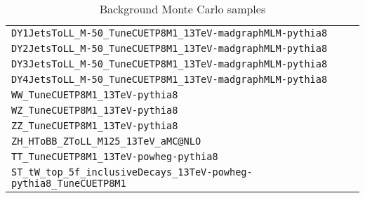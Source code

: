 \begin{table}[htbp]%
  \begin{center}
    \caption{Background Monte Carlo samples\label{tab:bg_mcsamples}}
    \begin{tabular}{|c|}%
      \hline
      \multicolumn{5}{|l|}{\texttt{DY1JetsToLL\_M-50\_TuneCUETP8M1\_13TeV-madgraphMLM-pythia8}} \\
      \multicolumn{5}{|l|}{\texttt{DY2JetsToLL\_M-50\_TuneCUETP8M1\_13TeV-madgraphMLM-pythia8}} \\
      \multicolumn{5}{|l|}{\texttt{DY3JetsToLL\_M-50\_TuneCUETP8M1\_13TeV-madgraphMLM-pythia8}} \\
      \multicolumn{5}{|l|}{\texttt{DY4JetsToLL\_M-50\_TuneCUETP8M1\_13TeV-madgraphMLM-pythia8}} \\
      \multicolumn{5}{|l|}{\texttt{WW\_TuneCUETP8M1\_13TeV-pythia8}} \\
      \multicolumn{5}{|l|}{\texttt{WZ\_TuneCUETP8M1\_13TeV-pythia8}} \\
      \multicolumn{5}{|l|}{\texttt{ZZ\_TuneCUETP8M1\_13TeV-pythia8}} \\
       \multicolumn{5}{|l|}{\texttt{ZH\_HToBB\_ZToLL\_M125\_13TeV\_aMC@NLO}} \\
      \multicolumn{5}{|l|}{\texttt{TT\_TuneCUETP8M1\_13TeV-powheg-pythia8}} \\
      \multicolumn{5}{|l|}{\texttt{ST\_tW\_top\_5f\_inclusiveDecays\_13TeV-powheg-pythia8\_TuneCUETP8M1}} \\

\end{tabular}
\end{center}
\end{table}
